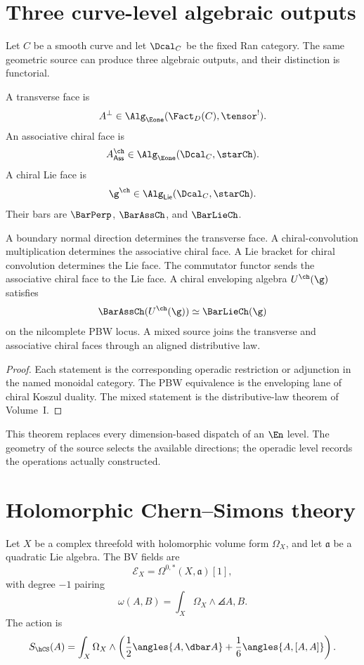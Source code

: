 \chapter{Three curve-level algebraic outputs}
Let $C$ be a smooth curve and let $\Dcal_C$ be the fixed Ran category.  The same geometric source can produce three algebraic outputs, and their distinction is functorial.

\begin{definition}
A transverse face is
\[
 A^\perp\in\Alg_{\Eone}(\Fact_D(C),\tensor^!).
\]
An associative chiral face is
\[
 A^{\ch}_{\mathsf{Ass}}\in\Alg_{\Eone}(\Dcal_C,\starCh).
\]
A chiral Lie face is
\[
 \g^{\ch}\in\Alg_{\mathsf{Lie}}(\Dcal_C,\starCh).
\]
Their bars are $\BarPerp$, $\BarAssCh$, and $\BarLieCh$.
\end{definition}

\begin{theorem}
A boundary normal direction determines the transverse face.  A chiral-convolution multiplication determines the associative chiral face.  A Lie bracket for chiral convolution determines the Lie face.  The commutator functor sends the associative chiral face to the Lie face.  A chiral enveloping algebra $U^{\ch}(\g)$ satisfies
\[
 \BarAssCh(U^{\ch}(\g))\simeq\BarLieCh(\g)
\]
on the nilcomplete PBW locus.  A mixed source joins the transverse and associative chiral faces through an aligned distributive law.
\end{theorem}
\begin{proof}
Each statement is the corresponding operadic restriction or adjunction in the named monoidal category.  The PBW equivalence is the enveloping lane of chiral Koszul duality.  The mixed statement is the distributive-law theorem of Volume~I.
\end{proof}

This theorem replaces every dimension-based dispatch of an $\En$ level.  The geometry of the source selects the available directions; the operadic level records the operations actually constructed.

\chapter{Holomorphic Chern--Simons theory}
Let $X$ be a complex threefold with holomorphic volume form $\Omega_X$, and let $\mathfrak a$ be a quadratic Lie algebra. The BV fields are
\[
 \mathcal E_X=\Omega^{0,*}(X,\mathfrak a)[1],
\]
with degree $-1$ pairing
\[
 \omega(A,B)=\int_X\Omega_X\wedge\angles{A,B}.
\]
The action is
\[
 S_{\hCS}(A)=\int_X\Omega_X\wedge
 \left(\frac12\angles{A,\dbar A}+\frac16\angles{A,[A,A]}\right).
\]

